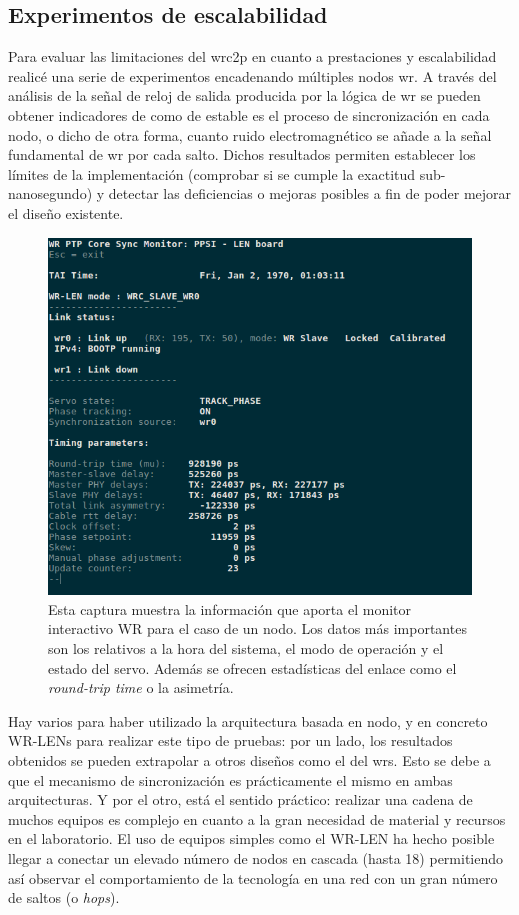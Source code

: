 \subsection{Experimentos de escalabilidad}

Para evaluar las limitaciones del \gls{wrc2p} en cuanto a prestaciones y 
escalabilidad realicé una serie de experimentos encadenando múltiples nodos 
\gls{wr}. A través del análisis de la señal de reloj de salida producida por 
la lógica de \gls{wr} se pueden obtener indicadores de como de estable es el 
proceso de sincronización en cada nodo, o dicho de otra forma, cuanto ruido 
electromagnético se añade a la señal fundamental de \gls{wr} por cada salto. 
Dichos resultados permiten establecer los límites de la implementación 
(comprobar si se cumple la exactitud sub-nanosegundo) y detectar las 
deficiencias o mejoras posibles a fin de poder mejorar el diseño existente.

\begin{figure}
	\centering
	\includegraphics[width=0.7\linewidth]{imagenes/len_gui}
	\caption[Captura del monitor WR en el dispositivo WR-LEN]{Esta captura 
	muestra la información que aporta el monitor interactivo WR para el caso de 
	un nodo. Los datos más importantes son los relativos a la hora del sistema, 
	el modo de operación y el estado del servo. Además se ofrecen estadísticas 
	del enlace como el \textit{round-trip time} o la asimetría.}
	\label{fig:lengui}
\end{figure}


Hay varios para haber utilizado la arquitectura basada en nodo, y en concreto 
WR-LENs para realizar este tipo de pruebas: por un lado, los resultados 
obtenidos se pueden extrapolar a otros diseños como el del \gls{wrs}. Esto se 
debe a que el mecanismo de sincronización es prácticamente el mismo en ambas 
arquitecturas. Y por el otro, está el sentido práctico: realizar una cadena de 
muchos equipos es complejo en cuanto a la gran necesidad de material y recursos 
en el laboratorio. El uso de equipos simples como el WR-LEN ha hecho posible 
llegar a conectar un elevado número de nodos en cascada (hasta 18) permitiendo 
así observar el comportamiento de la tecnología en una red con un gran número 
de saltos (o \textit{hops}).

